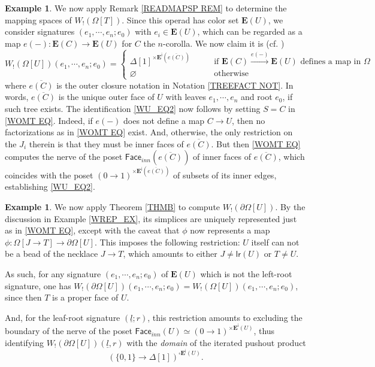 \documentclass[a4paper,10pt
,draft
]{article}%
\numberwithin{equation}{section}
\numberwithin{figure}{section}
\theoremstyle{definition} %
\newtheorem{example}[equation]{Example}%
\newcommand{\1}{\ensuremath{\mathbbm 1}}%
\begin{document}
\begin{example}
We now apply Remark \ref{READMAPSP REM}
to determine the mapping spaces of $W_!(\Omega[T])$.
Since this operad has color set 
$\boldsymbol{E}(U)$,
we consider signatures 
$(e_1,\cdots,e_n;e_0)$ with 
$e_i \in \boldsymbol{E}(U)$,
which can be regarded as a map
$e(-) \colon \boldsymbol{E}(C) \to \boldsymbol{E}(U)$
for $C$ the $n$-corolla.
We now claim it is 
(cf. \cite[\S 4]{CM13b})
\begin{equation}\label{WU_EQ2}
	W_!(\Omega[U])(e_1,\cdots,e_n;e_0) =
	\begin{cases}
	\Delta[1]^{\times \boldsymbol{E}^{\mathsf{i}}(\overline{e(C)})}
	\qquad
&
	\mbox{if $\boldsymbol{E}(C) \xrightarrow{e(-)} \boldsymbol{E}(U)$ defines a map in $\Omega$}
\\
	\varnothing
&
	\mbox{otherwise}
\end{cases}
\end{equation}
where $\overline{e(C)}$ is the outer closure notation in 
Notation \ref{TREEFACT NOT}.
In words, $\overline{e(C)}$ is the unique outer face of $U$
with leaves $e_1,\cdots,e_n$ and root $e_0$,
if such tree exists.
The identification \eqref{WU_EQ2}
now follows by setting $S=C$ in \eqref{WOMT EQ}. 
Indeed, if $e(-)$ does not define a map $C \to U$,
then no factorizations as in \eqref{WOMT EQ} exist.
And, otherwise, the only restriction on the $J_i$ therein
is that they must be inner faces of $\overline{e(C)}$.
But then \eqref{WOMT EQ} computes the nerve of the poset
$\mathsf{Face}_{inn}(\overline{e(C)})$ of inner faces of $\overline{e(C)}$,
which coincides with the poset 
$(0 \to 1)^{\times \boldsymbol{E}^{\mathsf{i}}(\overline{e(C)})}$
of subsets of its inner edges,
establishing \eqref{WU_EQ2}.
\end{example}




\begin{example}\label{WPARTIALT_EX}
	We now apply Theorem \ref{THMB} to compute
	$W_!(\partial \Omega[U])$.
	By the discussion in Example \ref{WREP_EX},
	its simplices are uniquely represented just as in 
	\eqref{WOMT EQ},
	except with the caveat that $\phi$
	now represents a map
	$\phi \colon \Omega[J\to T] \to \partial \Omega[U]$.
	This imposes the following restriction: $U$ itself can not be a bead of the necklace $J\to T$,
	which amounts to either 
	$J\neq \mathsf{lr}(U)$ or $T\neq U$.
	
	As such, for any signature
	$(e_1,\cdots,e_n;e_0)$ of $\boldsymbol{E}(U)$
	which is not the left-root signature,
	one has
	$W_!(\partial \Omega[U])(e_1,\cdots,e_n;e_0) =
	W_!(\Omega[U])(e_1,\cdots,e_n;e_0)$,
	since then $T$ is a proper face of $U$.
	
	And, for the leaf-root signature $(\underline{l};r)$,
	this restriction amounts to excluding the boundary
	of the nerve of the poset 
	$\mathsf{Face}_{inn}(U)
	\simeq 
	(0 \to 1)^{\times \boldsymbol{E}^{\mathsf{i}}(U)}$,
	thus identifying 	$W_!(\partial \Omega[U])(\underline{l},r)$ 
	with the \emph{domain} of the iterated pushout product
	\[
	\left(
	\{0,1\} \to \Delta[1]
	\right)^{\square \boldsymbol{E}^{\mathsf{i}}(U)}.
	\]
\end{example}
\end{document}
